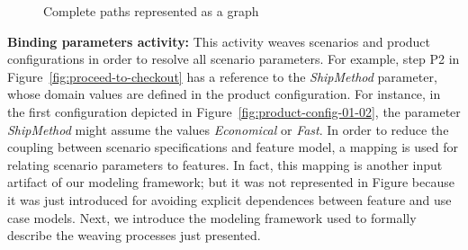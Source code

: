 \documentclass{acm_proc_article-sp}
\begin{document}
 
\begin{figure}[bth]
\begin{center}
\begin{tiny}
\begin{xy}
\end{xy}
\end{tiny}
\caption{Complete paths represented  as a graph}
\label{fig:complete-paths}
\end{center}
\end{figure}

{\bf Binding parameters activity:}  This activity weaves scenarios and product configurations in order to resolve all scenario parameters. 
For example, step P2 in Figure~\ref{fig:proceed-to-checkout} has a reference 
 to the \emph{ShipMethod} parameter, whose domain values are defined in the product configuration. For instance, in the first configuration depicted in Figure~\ref{fig:product-config-01-02}, the parameter \emph{ShipMethod} might assume the values \emph{Economical} or \emph{Fast}. 
In order to reduce the coupling between scenario specifications and feature model, a mapping is used for relating scenario parameters to features. In fact, this mapping is another input artifact of our modeling framework; but it was not represented in Figure because it was just introduced for avoiding explicit dependences between feature and use case models.  
Next, we introduce the modeling framework used to formally describe the weaving processes just presented. 
\end{document}
